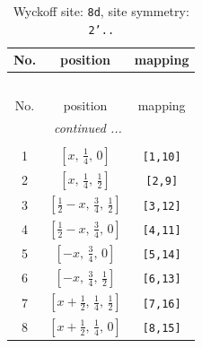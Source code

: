 \documentclass[fleqn,8pt]{jsarticle}
\begin{document}
\begin{longtable}{ccc}
\caption{Wyckoff site: {\tt 8d}, site symmetry: {\tt 2'..}}
 \\
 \hline \hline
No. & position & mapping \\ \hline \endfirsthead

\multicolumn{2}{l}{\tablename\ \thetable{}} \\
 \hline \hline
No. & position & mapping \\ \hline \endhead

 \hline \hline
\multicolumn{2}{r}{\footnotesize\it continued ...} \\ \endfoot

 \hline \hline
\multicolumn{2}{r}{} \\ \endlastfoot

1 & $\left[ x,\, \frac{1}{4},\, 0 \right]$ & {\tt [1,10]} \\ \hline
2 & $\left[ x,\, \frac{1}{4},\, \frac{1}{2} \right]$ & {\tt [2,9]} \\ \hline
3 & $\left[ \frac{1}{2} - x,\, \frac{3}{4},\, \frac{1}{2} \right]$ & {\tt [3,12]} \\ \hline
4 & $\left[ \frac{1}{2} - x,\, \frac{3}{4},\, 0 \right]$ & {\tt [4,11]} \\ \hline
5 & $\left[ - x,\, \frac{3}{4},\, 0 \right]$ & {\tt [5,14]} \\ \hline
6 & $\left[ - x,\, \frac{3}{4},\, \frac{1}{2} \right]$ & {\tt [6,13]} \\ \hline
7 & $\left[ x + \frac{1}{2},\, \frac{1}{4},\, \frac{1}{2} \right]$ & {\tt [7,16]} \\ \hline
8 & $\left[ x + \frac{1}{2},\, \frac{1}{4},\, 0 \right]$ & {\tt [8,15]} \\
\end{longtable}
\renewcommand{\arraystretch}{1.2}
\end{document}
